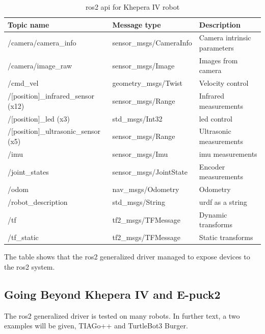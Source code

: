 \begin{table}[H]
    \begin{adjustwidth}{-1.5in}{-1.5in}
    \centering
    \begin{tabular}{|l|l|l|}
        \hline
        \textbf{Topic name} & \textbf{Message type} & \textbf{Description} \\
        \hline
        /camera/camera\_info & sensor\_msgs/CameraInfo & Camera intrinsic parameters \\
        \hline
        /camera/image\_raw & sensor\_msgs/Image & Images from camera \\
        \hline
        /cmd\_vel & geometry\_msgs/Twist & Velocity control \\
        \hline
        /[position]\_infrared\_sensor (x12) & sensor\_msgs/Range & Infrared measurements \\
        \hline
        /[position]\_led (x3) & std\_msgs/Int32 & \ac{led} control \\
        \hline
        /[position]\_ultrasonic\_sensor (x5) & sensor\_msgs/Range & Ultrasonic measurements \\
        \hline
        /imu & sensor\_msgs/Imu & \ac{imu} measurements \\
        \hline
        /joint\_states & sensor\_msgs/JointState & Encoder measurements \\
        \hline
        /odom & nav\_msgs/Odometry & Odometry \\
        \hline
        /robot\_description & std\_msgs/String & \ac{urdf} as a string \\
        \hline
        /tf & tf2\_msgs/TFMessage & Dynamic transforms \\
        \hline
        /tf\_static & tf2\_msgs/TFMessage & Static transforms \\
        \hline
    \end{tabular}
    \caption{\ac{ros2} \ac{api} for Khepera IV robot}
    \label{tab:result:khepera4_api}
    \end{adjustwidth}
\end{table}

The table shows that the \ac{ros2} generalized driver managed to expose devices to the \ac{ros2} system.

\subsection{Going Beyond Khepera IV and E-puck2}

The \ac{ros2} generalized driver is tested on many robots.
In further text, a two examples will be given, TIAGo++ and TurtleBot3 Burger.

